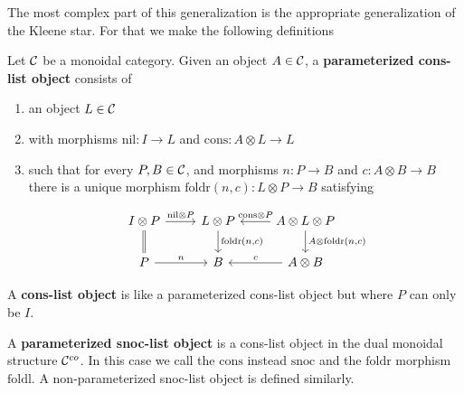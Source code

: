 \documentclass[acmsmall,anonymous,review,screen]{acmart}
\newcommand{\cat}[1]{
  \relax
  \StrLen{#1}[\arglength]
  \ifnum\arglength=1
  \mathcal{#1}
  \else
  \mathbf{#1}
  \fi
}
\begin{document}
The most complex part of this generalization is the appropriate
generalization of the Kleene star. For that we make the following
definitions
\begin{definition}
  Let $\cat C$ be a monoidal category. Given an object $A \in \cat C$,
  a \textbf{parameterized cons-list object} consists of
  \begin{enumerate}
  \item an object $L \in \cat C$
  \item with morphisms $\textrm{nil} : I \to L$ and $\textrm{cons} : A \otimes L \to L$
  \item such that for every $P,B \in \cat C$, and morphisms $n : P \to
    B$ and $c : A \otimes B \to B$ there is a unique morphism $\textrm{foldr}(n,c) : L
    \otimes P \to B$ satisfying

\[\begin{tikzcd}[ampersand replacement=\&]
	{I \otimes P} \& {L \otimes P} \& {A \otimes L \otimes P} \\
	P \& B \& {A \otimes B}
	\arrow["{\textrm{nil} \otimes P}", from=1-1, to=1-2]
	\arrow[equals, from=1-1, to=2-1]
	\arrow["{\textrm{foldr}(n,c)}", from=1-2, to=2-2]
	\arrow["{\textrm{cons} \otimes P}"', from=1-3, to=1-2]
	\arrow["{A \otimes \textrm{foldr}(n,c)}", from=1-3, to=2-3]
	\arrow["n", from=2-1, to=2-2]
	\arrow["c"', from=2-3, to=2-2]
\end{tikzcd}\]
  \end{enumerate}

  A \textbf{cons-list object} is like a parameterized cons-list object but where $P$ can only be $I$.

  A \textbf{parameterized snoc-list object} is a cons-list object in
  the dual monoidal structure $\cat C^{co}$. In this case we call the
  $\textrm{cons}$ instead $\textrm{snoc}$ and the $\textrm{foldr}$
  morphism $\textrm{foldl}$. A non-parameterized snoc-list object is
  defined similarly.
\end{definition}
\end{document}
